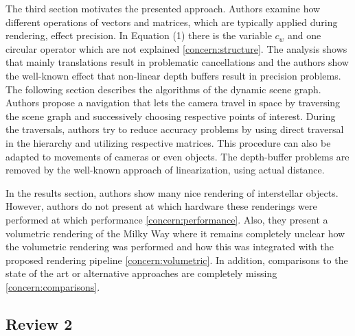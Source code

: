 \documentclass{article}
\begin{document}
The third section motivates the presented approach.
Authors examine how different operations of vectors and matrices, which are typically applied during rendering, effect precision.
In Equation (1) there is the variable $c_w$ and one circular operator which are not explained \eqref{concern:structure}. 
The analysis shows that mainly translations result in problematic cancellations and the authors show the well-known effect that non-linear depth buffers result in precision problems.
The following section describes the algorithms of the dynamic scene graph.
Authors propose a navigation that lets the camera travel in space by traversing the scene graph and successively choosing respective points of interest.
During the traversals, authors try to reduce accuracy problems by using direct traversal in the hierarchy and utilizing respective matrices.
This procedure can also be adapted to movements of cameras or even objects.
The depth-buffer problems are removed by the well-known approach of linearization, using actual distance.

In the results section, authors show many nice rendering of interstellar objects.
However, authors do not present at which hardware these renderings were performed at which performance \eqref{concern:performance}.
Also, they present a volumetric rendering of the Milky Way where it remains completely unclear how the volumetric rendering was performed and how this was integrated with the proposed rendering pipeline \eqref{concern:volumetric}.
In addition, comparisons to the state of the art or alternative approaches are completely missing \eqref{concern:comparisons}.

\subsection*{Review 2}

    
\end{document}

